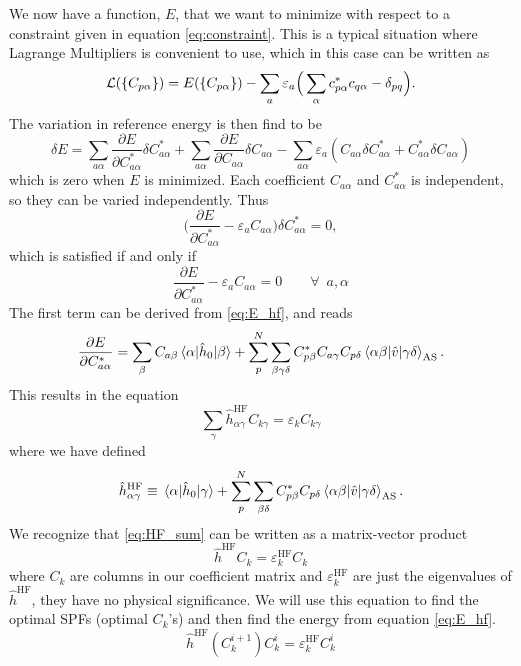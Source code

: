 We now have a function, $E$, that we want to minimize with respect to a constraint given in equation \eqref{eq:constraint}. This is a typical situation where Lagrange Multipliers is convenient to use, which in this case can be written as
\begin{equation}
{\cal L}(\{C_{p\alpha}\})=E(\{C_{p\alpha}\})-\sum_a\varepsilon_a\Big(\sum_{\alpha}c_{p\alpha}^*c_{q\alpha}-\delta_{pq}\Big).
\end{equation}
The variation in reference energy is then find to be
\begin{equation}
\delta E=\sum_{a\alpha}\frac{\partial E}{\partial C_{a\alpha}^*}\delta C_{a\alpha}^*+\sum_{a\alpha}\frac{\partial E}{\partial C_{a\alpha}}\delta C_{a\alpha}-\sum_{a\alpha}\varepsilon_a(C_{a\alpha}\delta C_{a\alpha}^*+C_{a\alpha}^*\delta C_{a\alpha})
\label{eq:E_hf}
\end{equation}
which is zero when $E$ is minimized. Each coefficient $C_{a\alpha}$ and $C_{a\alpha}^*$ is independent, so they can be varied independently. Thus
\begin{equation}
\bigg(\frac{\partial E}{\partial C_{a\alpha}^*}-\varepsilon_aC_{a\alpha}\bigg)\delta C_{a\alpha}^*=0,
\end{equation}
which is satisfied if and only if
\begin{equation}
\frac{\partial E}{\partial C_{a\alpha}^*}-\varepsilon_aC_{a\alpha}=0\qquad\forall\,\,\, a,\alpha
\end{equation}
The first term can be derived from \eqref{eq:E_hf}, and reads
\begin{equation}
\frac{\partial E}{\partial C_{a\alpha}^*}=\sum_{\beta}C_{a\beta}\mel{\alpha}{\hat{h}_0}{\beta}+\sum_p^N\sum_{\beta\gamma\delta}C_{p\beta}^*C_{a\gamma}C_{p\delta}\mel{\alpha\beta}{\hat{v}}{\gamma\delta}_{\text{AS}}.
\end{equation}
This results in the equation
\begin{equation}
\sum_{\gamma}\hat{h}_{\alpha\gamma}^{\text{HF}}C_{k\gamma}=\varepsilon_kC_{k\gamma}
\label{eq:HF_sum}
\end{equation}
where we have defined
\begin{equation}
\hat{h}_{\alpha\gamma}^{\text{HF}}\equiv\mel{\alpha}{\hat{h}_0}{\gamma}+\sum_p^N\sum_{\beta\delta}C_{p\beta}^*C_{p\delta}\mel{\alpha\beta}{\hat{v}}{\gamma\delta}_{\text{AS}}.
\end{equation}
We recognize that \eqref{eq:HF_sum} can be written as a matrix-vector product
\begin{equation}
\hat{h}^{\text{HF}}C_k=\varepsilon_k^{\text{HF}}C_k
\end{equation}
where $C_k$ are columns in our coefficient matrix and $\varepsilon_k^{\text{HF}}$ are just the eigenvalues of $\hat{h}^{\text{HF}}$, they have no physical significance. We will use this equation to find the optimal SPFs (optimal $C_k$'s) and then find the energy from equation \eqref{eq:E_hf}.
\begin{equation}
\hat{h}^{\text{HF}}(C_k^{i+1})C_k^i=\varepsilon_k^{\text{HF}}C_k^i
\end{equation}

